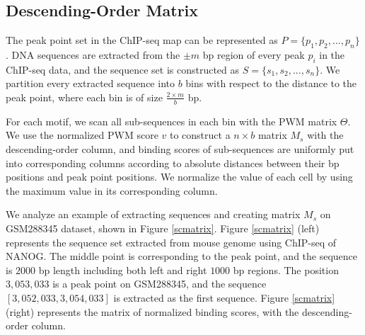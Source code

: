 \documentclass[journal,transmag]{IEEEtran}
\begin{document}
\begin{figure*}[!htpb]
\centering {} \hfil {} \caption{The sequence-specific binding information
of motif V\$MYOD\_01 in TRANSFAC database.} \label{pwm_figure}
\end{figure*}



\subsection{Descending-Order Matrix}


The peak point set in the ChIP-seq map can be represented as $P =
\{p_1, p_2, ..., p_n\}$. DNA sequences are extracted from the $\pm
m$ bp region of every peak $p_i$ in the ChIP-seq data, and the
sequence set is constructed as $S = \{s_1, s_2, ..., s_n\}$. We
partition every extracted sequence into $b$ bins with respect to the
distance to the peak point, where each bin is of size $\frac{2
\times m}{b}$ bp.

For each motif, we scan all sub-sequences in each bin with the PWM
matrix $\Theta$. We use the normalized PWM score $v$ to construct a
$n \times b$ matrix $M_{s}$ with the descending-order column, and
binding scores of sub-sequences are uniformly put into corresponding
columns according to absolute distances between their bp positions
and peak point positions. We normalize the value of each cell by
using the maximum value in its corresponding column.


We analyze an example of extracting sequences and creating matrix
$M_{s}$ on GSM288345 dataset, shown in Figure \ref{scmatrix}. Figure
\ref{scmatrix} (left) represents the sequence set extracted from
mouse genome using ChIP-seq of NANOG. The middle point is
corresponding to the peak point, and the sequence is $2000$ bp
length including both left and right $1000$ bp regions. The position
$3,053,033$ is a peak point on GSM288345, and the sequence
$[3,052,033, 3,054,033]$ is extracted as the first sequence. Figure
\ref{scmatrix} (right) represents the matrix of normalized binding
scores, with the descending-order column.


\begin{figure*}[!htpb]
\centering {} \caption{An example of extracting sequences and
creating matrix $M_{s}$ on GSM288345 dataset} \label{scmatrix}
\end{figure*}
\end{document}
